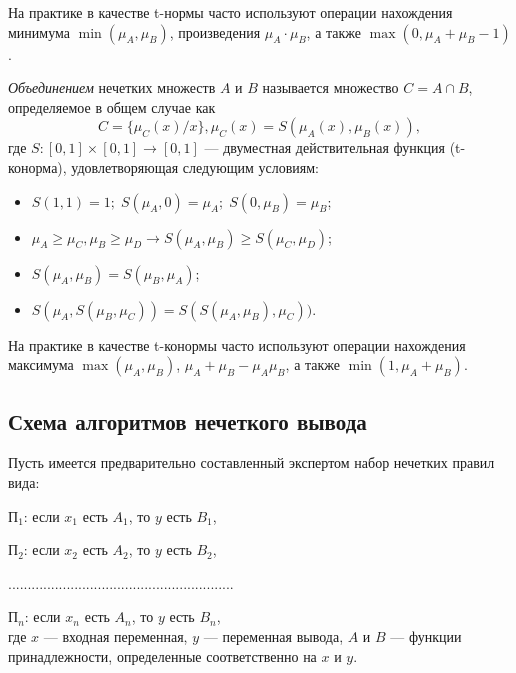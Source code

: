 На практике в качестве t-нормы часто используют операции
нахождения минимума \( \min(\mu_A, \mu_B ) \),
произведения \( \mu_A \cdot \mu_B \), а также
\( \max(0, \mu_A + \mu_B - 1) \).

\emph{Объединением} нечетких множеств \( A \) и \( B \) называется множество
\( C = A \cap B \), определяемое в общем случае как
\[ C = \{ \mu_C(x) / x \}, \mu_C(x) = S(\mu_A(x), \mu_B(x)), \]
где \( S: [0, 1] \times [0,1] \rightarrow [0, 1] \) ---
двуместная действительная функция (t-конорма), удовлетворяющая следующим условиям:
\begin{itemize}
\item \( S(1, 1) = 1; \; S(\mu_A, 0) = \mu_A; \; S(0, \mu_B) = \mu_B \);
\item \( \mu_A \ge \mu_C, \mu_B \ge \mu_D \rightarrow S(\mu_A, \mu_B) \ge S(\mu_C, \mu_D) \);
\item \( S(\mu_A, \mu_B) = S(\mu_B, \mu_A) \);
\item \( S(\mu_A, S(\mu_B, \mu_C)) = S(S(\mu_A, \mu_B), \mu_C)) \).
\end{itemize}

На практике в качестве t-конормы часто используют операции
нахождения максимума \( \max(\mu_A, \mu_B ) \),
\( \mu_A + \mu_B - \mu_A \mu_B \), а также
\( \min(1, \mu_A + \mu_B) \).

\pagebreak

\subsection{Схема алгоритмов нечеткого вывода}

Пусть имеется предварительно составленный экспертом набор нечетких правил вида: \par
\( \text{П}_1 \): если \( x_1 \) есть \( A_1 \), то \( y \) есть \( B_1 \), \par
\( \text{П}_2 \): если \( x_2 \) есть \( A_2 \), то \( y \) есть \( B_2 \), \par
..........................................................  \par
\( \text{П}_n \): если \( x_n \) есть \( A_n \), то \( y \) есть \( B_n \), \\
где \( x \) --- входная переменная,
\( y \) --- переменная вывода,
\( A \) и \( B \) --- функции принадлежности,
определенные соответственно на \( x \) и \( y \).


